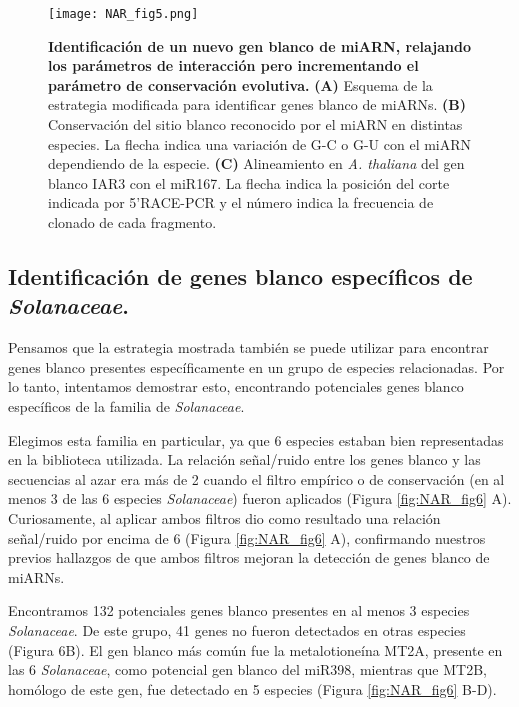 \begin{figure}[htbp!] 
    \centering    
    \texttt{[image: NAR\_fig5.png]}
    \caption[Identificación de un nuevo gen blanco de miARN]{
    \textbf{Identificación de un nuevo gen blanco de miARN, relajando los parámetros de interacción pero incrementando el parámetro de conservación evolutiva.}
    \textbf{(A)} Esquema de la estrategia modificada para identificar genes blanco de miARNs.
    \textbf{(B)} Conservación del sitio blanco reconocido por el miARN en distintas especies.
    La flecha indica una variación de G-C o G-U con el miARN dependiendo de la especie.
    \textbf{(C)} Alineamiento en \textit{A. thaliana} del gen blanco IAR3 con el miR167. La flecha indica la posición del corte indicada por 5’RACE-PCR y el número indica la frecuencia de clonado de cada fragmento.}
    \label{fig:NAR_fig5}
\end{figure}


\subsection{Identificación de genes blanco específicos de \textit{Solanaceae}.}

Pensamos que la estrategia mostrada también se puede utilizar para encontrar genes blanco presentes específicamente en un grupo de especies relacionadas.
Por lo tanto, intentamos demostrar esto, encontrando potenciales genes blanco específicos de la familia de \textit{Solanaceae}. 

Elegimos esta familia en particular, ya que 6 especies estaban bien representadas en la biblioteca utilizada.
La relación señal/ruido entre los genes blanco y las secuencias al azar era más de 2 cuando el filtro empírico o de conservación (en al menos 3 de las 6 especies \textit{Solanaceae}) fueron aplicados (Figura \ref{fig:NAR_fig6} A).
Curiosamente, al aplicar ambos filtros dio como resultado una relación señal/ruido por encima de 6 (Figura \ref{fig:NAR_fig6} A), confirmando nuestros previos hallazgos de que ambos filtros mejoran la detección de genes blanco de miARNs.

Encontramos 132 potenciales genes blanco presentes en al menos 3 especies \textit{Solanaceae}. De este grupo, 41 genes no fueron detectados en otras especies (Figura 6B).
El gen blanco más común fue la metalotioneína MT2A, presente en las 6 \textit{Solanaceae}, como potencial gen blanco del miR398, mientras que MT2B, homólogo de este gen, fue detectado en 5 especies (Figura \ref{fig:NAR_fig6} B-D).

